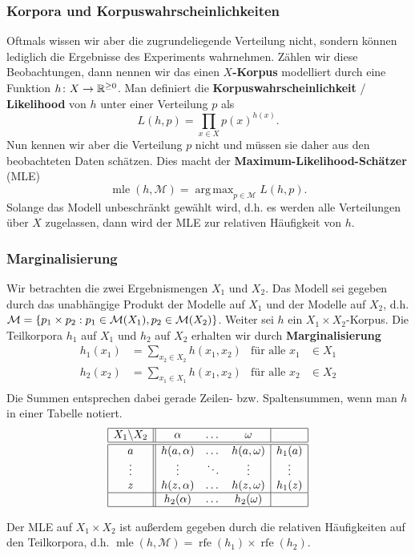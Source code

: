 \documentclass{beamer}
\DeclareMathOperator*{\argmax}{arg\,max}
\DeclareMathOperator{\rfe}{rfe}
\begin{document}
\begin{frame} \frametitle{Korpora und Korpuswahrscheinlichkeiten}
	\justifying \footnotesize
	Oftmals wissen wir aber die zugrundeliegende Verteilung nicht, sondern können lediglich die Ergebnisse des Experiments wahrnehmen. Zählen wir diese Beobachtungen, dann nennen wir das einen \textbf{$X$-Korpus} modelliert durch eine Funktion $h \colon X \to \mathbb{R}^{\ge 0}$.
	Man definiert die \textbf{Korpuswahrscheinlichkeit} / \textbf{Likelihood} von $h$ unter einer Verteilung $p$ als
	\begin{equation*}
		L(h,p) = \prod_{x \in X} p(x)^{h(x)} .
	\end{equation*} 
	Nun kennen wir aber die Verteilung $p$ nicht und müssen sie daher aus den beobachteten Daten schätzen. Dies macht der\textbf{ Maximum-Likelihood-Schätzer} (MLE)
	\begin{equation*}
		\operatorname{mle}(h,\mathcal{M}) = \argmax_{p \in \mathcal{M}} L(h,p) .
	\end{equation*}
	Solange das Modell unbeschränkt gewählt wird, d.h. es werden alle Verteilungen über $X$ zugelassen, dann wird der MLE zur relativen Häufigkeit von $h$.
\end{frame}

\begin{frame} \frametitle{Marginalisierung}
	\justifying \footnotesize
	Wir betrachten die zwei Ergebnismengen $X_1$ und $X_2$. Das Modell sei gegeben durch das unabhängige Produkt der Modelle auf $X_1$ und der Modelle auf $X_2$, d.h. $\mathcal{M} = \left\{  p_1 \times p_2 : p_1 \in \mathcal{M}(X_1), p_2 \in \mathcal{M}(X_2) \right\}$. Weiter sei $h$ ein $X_1 \times X_2$-Korpus. Die Teilkorpora $h_1$ auf $X_1$ und $h_2$ auf $X_2$ erhalten wir durch \textbf{Marginalisierung}
	\begin{equation*}
		\begin{aligned}
			h_1(x_1) &= \sum_{x_2 \in X_2} h(x_1, x_2) & \text{für alle } x_1 &\in X_1 \\
			h_2(x_2) &= \sum_{x_1 \in X_1} h(x_1, x_2) & \text{für alle } x_2 &\in X_2 \\
		\end{aligned}
	\end{equation*}
	Die Summen entsprechen dabei gerade Zeilen- bzw. Spaltensummen, wenn man $h$ in einer Tabelle notiert.
	\begin{equation*}
		\begin{array}{|c||ccc|c|}
		\hline
			X_1 \backslash X_2 & \alpha & \dots & \omega & \\ \hline \hline
			a & h(a,\alpha) & \dots & h(a,\omega) & h_1(a) \\
			\vdots &\vdots & \ddots & \vdots & \vdots \\
			z & h(z,\alpha) & \dots & h(z,\omega) & h_1(z) \\ \hline
			& h_2(\alpha) & \dots & h_2(\omega) & \\ \hline
		\end{array}
	\end{equation*}
	
	Der MLE auf $X_1 \times X_2$ ist außerdem gegeben durch die relativen Häufigkeiten auf den Teilkorpora, d.h. $\operatorname{mle}(h, \mathcal{M}) = \rfe(h_1) \times \rfe(h_2)$.	
\end{frame}
\end{document}
